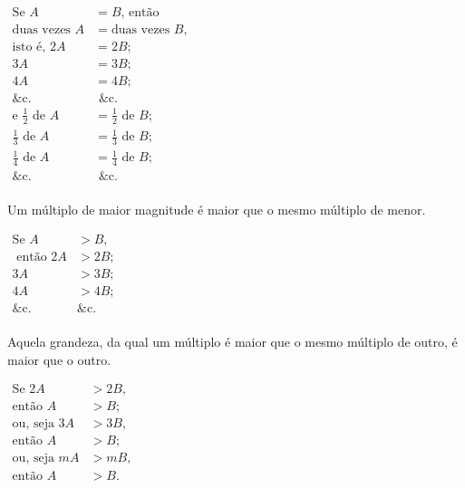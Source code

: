 \documentclass[booklanguage=brazilian]{byrnebook}
\begin{document}
\begin{center}
$
\begin{aligned}
\mbox{Se } A &= B \mbox{, então}\\
	\mbox{duas vezes } A &= \mbox{duas vezes } B \mbox{,}\\
	\mbox{isto é, }2A &= 2B \mbox{;}\\
	3A &= 3B \mbox{;}\\
	4A &= 4B \mbox{;}\\
	\mbox{\&c.} & \mbox{ \&c.}\\
	\mbox{e } \frac{1}{2} \mbox{ de } A &= \frac{1}{2} \mbox{ de } B \mbox{;}\\
	\frac{1}{3} \mbox{ de } A &= \frac{1}{3} \mbox{ de } B \mbox{;}\\
	\frac{1}{4} \mbox{ de } A &= \frac{1}{4} \mbox{ de } B \mbox{;}\\
	\mbox{\&c. } & \mbox{ \&c.}\\
\end{aligned}
$
\end{center}

\startaxiom{}\label{ax:V.II}
Um múltiplo de maior magnitude é maior que o mesmo múltiplo de menor.

\begin{center}
$\begin{aligned}
	\mbox{Se } A &> B \mbox{,} \\
	\mbox{ então } 2A &> 2B \mbox{;}\\
	3A&> 3B \mbox{;} \\
	4A &> 4B \mbox{;}\\
	\mbox{\&c. } &\mbox{\&c.} \\
\end{aligned}
$
\end{center}

\startaxiom{}\label{ax:V.III}
Aquela grandeza, da qual um múltiplo é maior que o mesmo múltiplo de outro, é maior que o outro.

\begin{center}
$\begin{aligned}
\mbox{Se } 2A &> 2B \mbox{,}\\
\mbox{então } A &> B \mbox{;}\\
\mbox{ou, seja } 3A &> 3B \mbox{,}\\
\mbox{então } A &> B \mbox{;}\\
\mbox{ou, seja } mA &> mB  \mbox{,}\\
\mbox{então } A &> B \mbox{.}\\
\end{aligned}$
\end{center}
\end{document}
